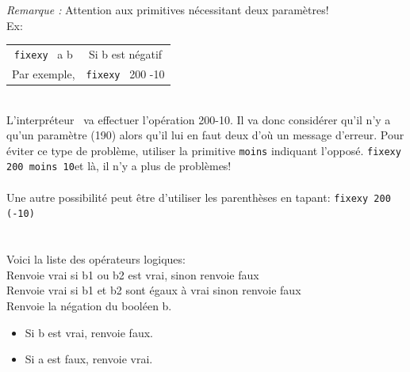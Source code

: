 \vspace{0.5cm}
\noindent \textit{Remarque :} Attention aux primitives nécessitant deux paramètres!\\
Ex:
\begin{tabular}{cc}
 \texttt{fixexy} \ a b &
 Si b est négatif\\
 Par exemple, &
 \texttt{fixexy} \ 200 -10\\
\end{tabular}
\\
L'interpréteur \logo\ va effectuer l'opération 200-10. Il va donc considérer qu'il n'y a qu'un paramètre (190) alors qu'il lui en faut deux d'où un message d'erreur. Pour éviter ce type de problème, utiliser la primitive \og \texttt{moins} \fg indiquant l'opposé. \texttt{fixexy 200 moins 10}et là, il n'y a plus de problèmes!\\ \\
Une autre possibilité peut être d'utiliser les parenthèses en tapant: \texttt{fixexy 200 (-10)}\\ \\ \\
 \noindent Voici la liste des opérateurs logiques:\\
 Renvoie vrai si b1 ou b2 est vrai, sinon renvoie faux\\
 Renvoie vrai si b1 et b2 sont égaux à vrai sinon renvoie faux\\
 Renvoie la négation du booléen b.
\begin{itemize}
 \item  Si b est vrai, renvoie faux.
 \item Si a est faux, renvoie vrai.
\end{itemize}
